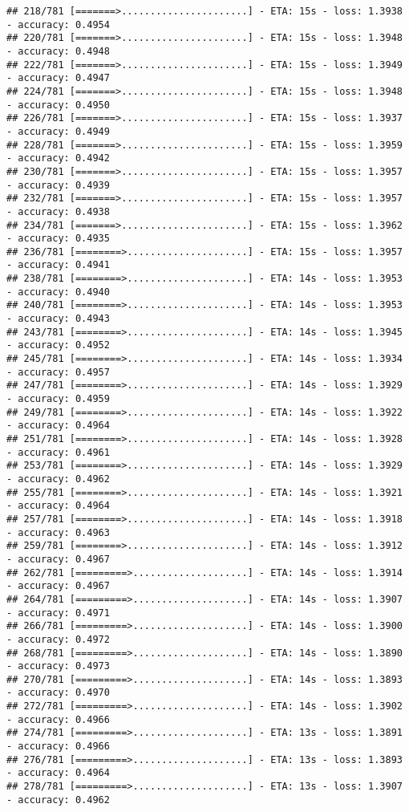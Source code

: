 \documentclass[
]{article}
\begin{document}
\begin{verbatim}
## 218/781 [=======>......................] - ETA: 15s - loss: 1.3938 - accuracy: 0.4954
## 220/781 [=======>......................] - ETA: 15s - loss: 1.3948 - accuracy: 0.4948
## 222/781 [=======>......................] - ETA: 15s - loss: 1.3949 - accuracy: 0.4947
## 224/781 [=======>......................] - ETA: 15s - loss: 1.3948 - accuracy: 0.4950
## 226/781 [=======>......................] - ETA: 15s - loss: 1.3937 - accuracy: 0.4949
## 228/781 [=======>......................] - ETA: 15s - loss: 1.3959 - accuracy: 0.4942
## 230/781 [=======>......................] - ETA: 15s - loss: 1.3957 - accuracy: 0.4939
## 232/781 [=======>......................] - ETA: 15s - loss: 1.3957 - accuracy: 0.4938
## 234/781 [=======>......................] - ETA: 15s - loss: 1.3962 - accuracy: 0.4935
## 236/781 [========>.....................] - ETA: 15s - loss: 1.3957 - accuracy: 0.4941
## 238/781 [========>.....................] - ETA: 14s - loss: 1.3953 - accuracy: 0.4940
## 240/781 [========>.....................] - ETA: 14s - loss: 1.3953 - accuracy: 0.4943
## 243/781 [========>.....................] - ETA: 14s - loss: 1.3945 - accuracy: 0.4952
## 245/781 [========>.....................] - ETA: 14s - loss: 1.3934 - accuracy: 0.4957
## 247/781 [========>.....................] - ETA: 14s - loss: 1.3929 - accuracy: 0.4959
## 249/781 [========>.....................] - ETA: 14s - loss: 1.3922 - accuracy: 0.4964
## 251/781 [========>.....................] - ETA: 14s - loss: 1.3928 - accuracy: 0.4961
## 253/781 [========>.....................] - ETA: 14s - loss: 1.3929 - accuracy: 0.4962
## 255/781 [========>.....................] - ETA: 14s - loss: 1.3921 - accuracy: 0.4964
## 257/781 [========>.....................] - ETA: 14s - loss: 1.3918 - accuracy: 0.4963
## 259/781 [========>.....................] - ETA: 14s - loss: 1.3912 - accuracy: 0.4967
## 262/781 [=========>....................] - ETA: 14s - loss: 1.3914 - accuracy: 0.4967
## 264/781 [=========>....................] - ETA: 14s - loss: 1.3907 - accuracy: 0.4971
## 266/781 [=========>....................] - ETA: 14s - loss: 1.3900 - accuracy: 0.4972
## 268/781 [=========>....................] - ETA: 14s - loss: 1.3890 - accuracy: 0.4973
## 270/781 [=========>....................] - ETA: 14s - loss: 1.3893 - accuracy: 0.4970
## 272/781 [=========>....................] - ETA: 14s - loss: 1.3902 - accuracy: 0.4966
## 274/781 [=========>....................] - ETA: 13s - loss: 1.3891 - accuracy: 0.4966
## 276/781 [=========>....................] - ETA: 13s - loss: 1.3893 - accuracy: 0.4964
## 278/781 [=========>....................] - ETA: 13s - loss: 1.3907 - accuracy: 0.4962

\end{verbatim}
\end{document}
